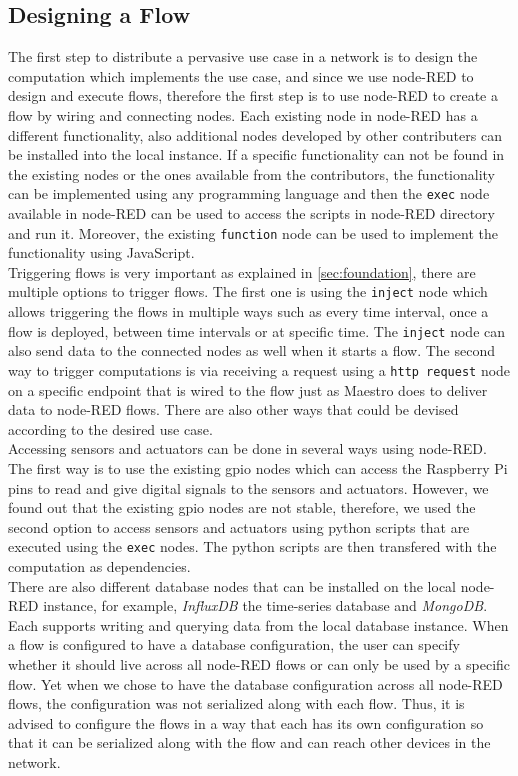 \subsection{Designing a Flow}
The first step to distribute a pervasive use case in a network is to design the computation which implements the use case, and since we use node-RED to design and execute flows, therefore the first step is to use node-RED to create a flow by wiring and connecting nodes. Each existing node in node-RED has a different functionality, also additional nodes developed by other contributers can be installed into the local instance. If a specific functionality can not be found  in the existing nodes or the ones available from the contributors, the functionality can be implemented using any programming language and then  the \verb|exec| node available in node-RED can be used to access the scripts in node-RED directory and run it. Moreover, the  existing \verb|function| node can be used to implement the functionality using  JavaScript. \\

\noindent Triggering flows is very important as explained in \ref{sec:foundation}, there are multiple options to trigger flows. The first one is using the \verb|inject| node which allows  triggering the flows in multiple ways such as every time interval, once a flow is deployed, between time intervals or at specific time. The \verb|inject| node can also send data to the connected nodes as well when it starts a flow. The second way to trigger computations is via receiving a request using a \verb|http request| node on a specific endpoint that is wired to the flow just as Maestro does to deliver data to node-RED flows. There are also other ways that could be devised according to the desired use case.\\
 

\noindent Accessing sensors and actuators can be done in several ways using node-RED. The first way is to use the existing gpio nodes which can access the Raspberry Pi pins to read  and give digital signals to the sensors and actuators. However, we found out that the existing gpio nodes are not stable, therefore, we used the second option to access sensors and actuators using python scripts that are executed using the \verb|exec| nodes. The python scripts are then transfered with the computation as  dependencies.\\

\noindent There are also different  database nodes that can be installed on the local node-RED instance, for example, \textit{InfluxDB} the time-series database and \textit{MongoDB}. Each supports writing and querying data from the local database instance. When a flow is configured to have a database configuration, the user can specify whether it should live across all node-RED flows or can  only be used by a specific flow.  Yet when we chose to have the database configuration across all node-RED flows, the configuration was not serialized along with each flow. Thus, it is advised to configure the flows in a way that each has its own configuration so that it can be serialized along with the flow and can reach other devices in the network.\\


